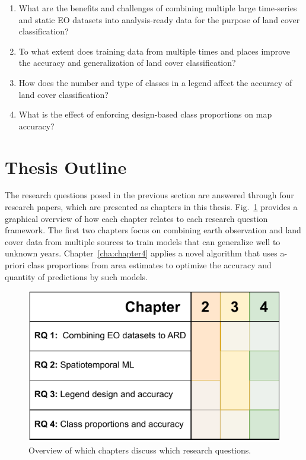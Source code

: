 \begin{enumerate}
\item %
What are the benefits and challenges of combining multiple large time-series and static EO datasets into analysis-ready data for the purpose of land cover classification?
\item %
To what extent does training data from multiple times and places improve the accuracy and generalization of land cover classification?
\item %
How does the number and type of classes in a legend affect the accuracy of land cover classification?
\item %
What is the effect of enforcing design-based class proportions on map accuracy?
\end{enumerate}

\section{Thesis Outline}

The research questions posed in the previous section are answered through four research papers, which are presented as chapters in this thesis. Fig.\@~\ref{fig:01_rqs_chapters} provides a graphical overview of how each chapter relates to each research question framework. The first two chapters focus on combining earth observation and land cover data from multiple sources to train models that can generalize well to unknown years. Chapter\@~\ref{cha:chapter4} applies a novel algorithm that uses a-priori class proportions from area estimates to optimize the accuracy and quantity of predictions by such models.

\begin{figure}[H]
    \centering
    \includegraphics[width=.55\textwidth]{figs_01/fig_rqs_chapters.pdf}
    \caption{Overview of which chapters discuss which research questions.}
    \label{fig:01_rqs_chapters}
\end{figure}

